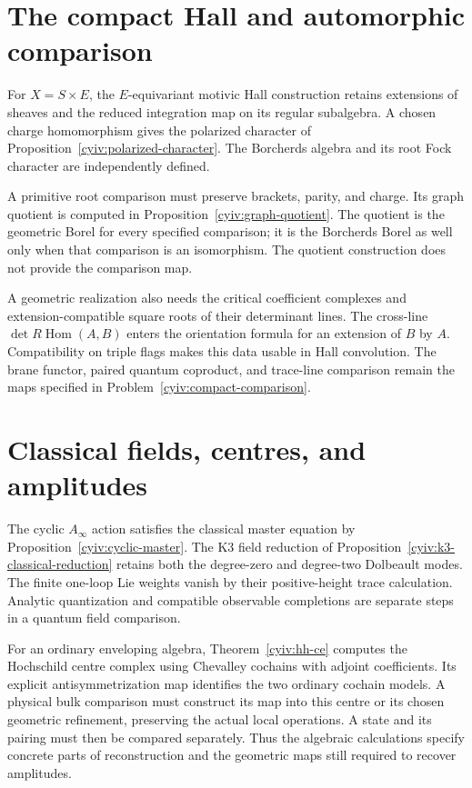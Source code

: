 \chapter{The compact Hall and automorphic comparison}
For $X=S\times E$, the $E$-equivariant motivic Hall construction retains
extensions of sheaves and the reduced integration map on its regular
subalgebra.
A chosen charge homomorphism gives the polarized character of
Proposition~\ref{cyiv:polarized-character}.
The Borcherds algebra and its root Fock character are independently defined.

A primitive root comparison must preserve brackets, parity, and charge.
Its graph quotient is computed in Proposition~\ref{cyiv:graph-quotient}.
The quotient is the geometric Borel for every specified comparison;
it is the Borcherds Borel as well only when that comparison is an
isomorphism.
The quotient construction does not provide the comparison map.

A geometric realization also needs the critical coefficient complexes
and extension-compatible square roots of their determinant lines.
The cross-line $\det R\operatorname{Hom}(A,B)$ enters the orientation
formula for an extension of $B$ by $A$.
Compatibility on triple flags makes this data usable in Hall convolution.
The brane functor, paired quantum coproduct, and trace-line comparison
remain the maps specified in Problem~\ref{cyiv:compact-comparison}.

\chapter{Classical fields, centres, and amplitudes}
The cyclic $A_\infty$ action satisfies the classical master equation by
Proposition~\ref{cyiv:cyclic-master}.
The K3 field reduction of Proposition~\ref{cyiv:k3-classical-reduction}
retains both the degree-zero and degree-two Dolbeault modes.
The finite one-loop Lie weights vanish by their positive-height trace
calculation.
Analytic quantization and compatible observable completions are separate
steps in a quantum field comparison.

For an ordinary enveloping algebra, Theorem~\ref{cyiv:hh-ce} computes the
Hochschild centre complex using Chevalley cochains with adjoint
coefficients.
Its explicit antisymmetrization map identifies the two ordinary
cochain models.
A physical bulk comparison must construct its map into this centre or
its chosen geometric refinement, preserving the actual local operations.
A state and its pairing must then be compared separately.
Thus the algebraic calculations specify concrete parts of reconstruction
and the geometric maps still required to recover amplitudes.
